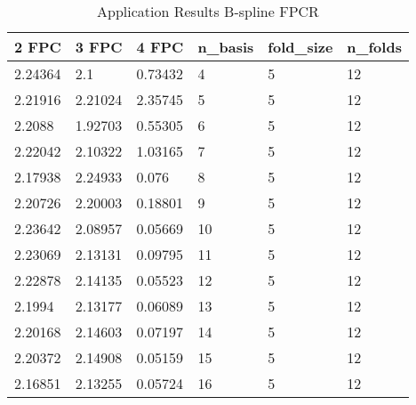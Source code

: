 \begin{table}[H]
			\centering
			\caption{Application Results B-spline FPCR}
				\begin{tabular}{lll|lll}
\hline
\textbf{2 FPC} & \textbf{3 FPC} & \textbf{4 FPC}                        & \textbf{n\_basis} & \textbf{fold\_size} & \textbf{n\_folds} \\ \hline
2.24364                        & 2.1                            & 0.73432                       & 4       & 5         & 12      \\
2.21916                        & 2.21024                        & 2.35745                       & 5       & 5         & 12      \\
2.2088                         & 1.92703                        & 0.55305                       & 6       & 5         & 12      \\
2.22042                        & 2.10322                        & 1.03165                       & 7       & 5         & 12      \\
2.17938                        & 2.24933                        & 0.076                         & 8       & 5         & 12      \\
2.20726                        & 2.20003                        & 0.18801                       & 9       & 5         & 12      \\
2.23642                        & 2.08957                        & 0.05669                       & 10      & 5         & 12      \\
2.23069                        & 2.13131                        & 0.09795                       & 11      & 5         & 12      \\
2.22878                        & 2.14135                        & 0.05523                       & 12      & 5         & 12      \\
2.1994                         & 2.13177                        & 0.06089                       & 13      & 5         & 12      \\
2.20168                        & 2.14603                        & 0.07197                       & 14      & 5         & 12      \\
2.20372                        & 2.14908                        & 0.05159                       & 15      & 5         & 12      \\
2.16851                        & 2.13255                        & 0.05724                       & 16      & 5         & 12      \\

\end{tabular}
\end{table}
